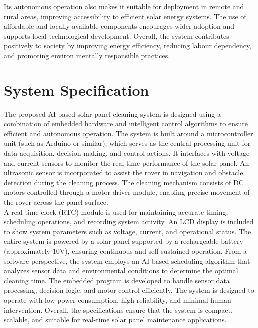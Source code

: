 \documentclass[10pt]{report}
\begin{document}
\begin{sloppypar}
{{{\begin{sloppypar}
Its autonomous operation also makes it suitable for deployment in remote and rural
areas, improving accessibility to efficient solar energy systems. The use of affordable and locally available components encourages wider adoption and supports local
technological development. Overall, the system contributes positively to society by
improving energy efficiency, reducing labour dependency, and promoting environ
mentally responsible practices.

\section{System Specification}
\hspace{0.5cm}
The proposed AI-based solar panel cleaning system is designed using a combination of embedded hardware and intelligent control algorithms to ensure efficient and
autonomous operation. The system is built around a microcontroller unit (such as
Arduino or similar), which serves as the central processing unit for data acquisition,
decision-making, and control actions. It interfaces with voltage and current sensors
to monitor the real-time performance of the solar panel. An ultrasonic sensor is incorporated to assist the rover in navigation and obstacle detection during the cleaning
process. The cleaning mechanism consists of DC motors controlled through a motor driver module, enabling precise movement of the rover across the panel surface.
\\

A real-time clock (RTC) module is used for maintaining accurate timing, scheduling operations, and recording system activity. An LCD display is included to show
system parameters such as voltage, current, and operational status. The entire system is powered by a solar panel supported by a rechargeable battery (approximately
10V), ensuring continuous and self-sustained operation. From a software perspective, the system employs an AI-based scheduling algorithm that analyzes sensor data
and environmental conditions to determine the optimal cleaning time. The embedded program is developed to handle sensor data processing, decision logic, and motor
control efficiently. The system is designed to operate with low power consumption,
high reliability, and minimal human intervention. Overall, the specifications ensure
that the system is compact, scalable, and suitable for real-time solar panel maintenance applications.
\\


\end{sloppypar}}}}
\end{sloppypar}
\end{document}
